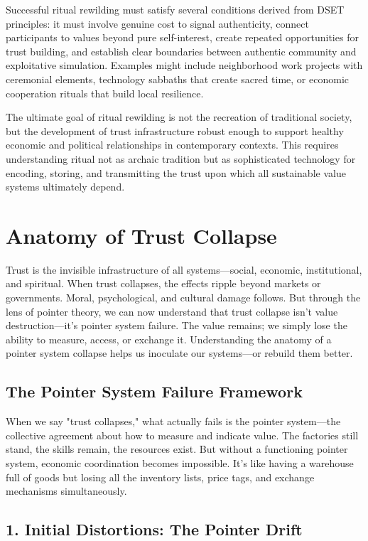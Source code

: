 \documentclass[11pt,oneside]{book}
\begin{document}
Successful ritual rewilding must satisfy several conditions derived from DSET principles: it must involve genuine cost to signal authenticity, connect participants to values beyond pure self-interest, create repeated opportunities for trust building, and establish clear boundaries between authentic community and exploitative simulation. Examples might include neighborhood work projects with ceremonial elements, technology sabbaths that create sacred time, or economic cooperation rituals that build local resilience.

The ultimate goal of ritual rewilding is not the recreation of traditional society, but the development of trust infrastructure robust enough to support healthy economic and political relationships in contemporary contexts. This requires understanding ritual not as archaic tradition but as sophisticated technology for encoding, storing, and transmitting the trust upon which all sustainable value systems ultimately depend.


\chapter{Anatomy of Trust Collapse}

Trust is the invisible infrastructure of all systems—social, economic, institutional, and spiritual. When trust collapses, the effects ripple beyond markets or governments. Moral, psychological, and cultural damage follows. But through the lens of pointer theory, we can now understand that trust collapse isn't value destruction—it's pointer system failure. The value remains; we simply lose the ability to measure, access, or exchange it. Understanding the anatomy of a pointer system collapse helps us inoculate our systems—or rebuild them better.

\section{The Pointer System Failure Framework}

When we say "trust collapses," what actually fails is the pointer system—the collective agreement about how to measure and indicate value. The factories still stand, the skills remain, the resources exist. But without a functioning pointer system, economic coordination becomes impossible. It's like having a warehouse full of goods but losing all the inventory lists, price tags, and exchange mechanisms simultaneously.
\section{1. Initial Distortions: The Pointer Drift}
\end{document}
